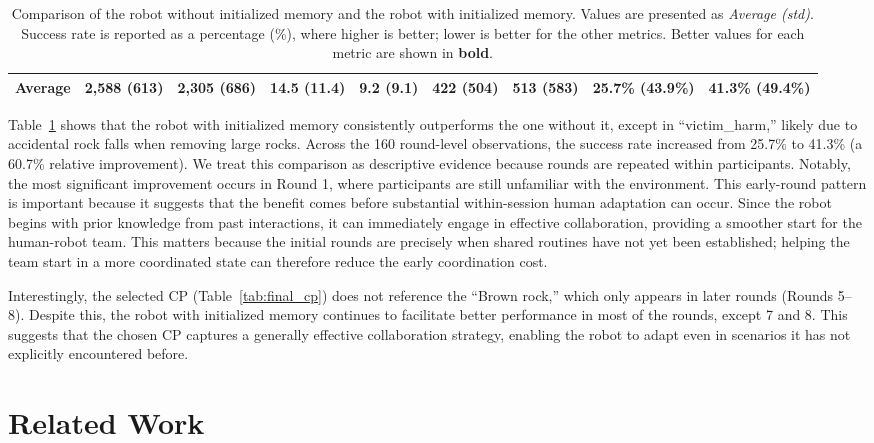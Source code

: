 \documentclass[letterpaper, 10 pt, conference]{ieeeconf}  %
\begin{document}
\begin{table}[tb]
{\begin{tabular}{c|cc|cc|cc|cc}
    \midrule
    \textbf{Average} 
    & 2,588 (613)  & \textbf{2,305 (686)}  
    & 14.5 (11.4) & \textbf{9.2 (9.1)}  
    & \textbf{422 (504)}   & 513 (583)  
    & 25.7\% (43.9\%)  & \textbf{41.3\% (49.4\%)}  \\
    \bottomrule
    \end{tabular}
    }
    \caption{Comparison of the robot without initialized memory and the robot with initialized memory. Values are presented as \textit{Average (std)}. Success rate is reported as a percentage (\%), where higher is better; lower is better for the other metrics. Better values for each metric are shown in \textbf{bold}.}
    \label{tab:comparison} 
\end{table}

Table~\ref{tab:comparison} shows that the robot with initialized memory consistently
outperforms the one without it, except in ``victim\_harm,'' likely due to accidental
rock falls when removing large rocks. Across the 160 round-level observations, the
success rate increased from 25.7\% to 41.3\% (a 60.7\% relative improvement). We treat
this comparison as descriptive evidence because rounds are repeated within participants.
Notably, the most significant improvement occurs in Round 1, where participants are
still unfamiliar with the environment. This early-round pattern is important because it
suggests that the benefit comes before substantial within-session human adaptation can
occur. Since the robot begins with prior knowledge from past interactions, it can
immediately engage in effective collaboration, providing a smoother start for the
human-robot team. This matters because the initial rounds are precisely when shared
routines have not yet been established; helping the team start in a more coordinated
state can therefore reduce the early coordination cost.

Interestingly, the selected CP (Table~\ref{tab:final_cp}) does not reference the ``Brown
rock,'' which only appears in later rounds (Rounds 5–8). Despite this, the robot with
initialized memory continues to facilitate better performance in most of the rounds,
except 7 and 8. This suggests that the chosen CP captures a generally effective
collaboration strategy, enabling the robot to adapt even in scenarios it has not
explicitly encountered before.

\section{Related Work}
\label{sec:related_work}
\end{document}
